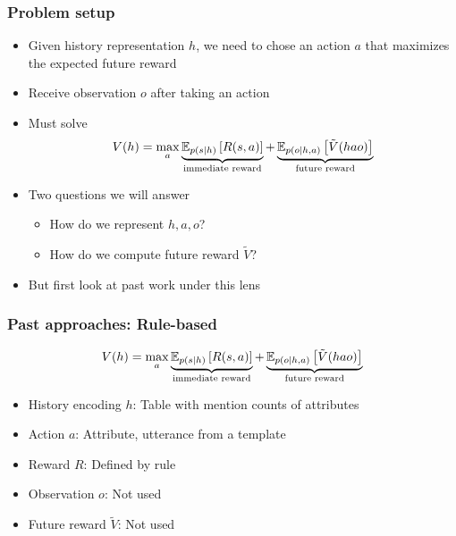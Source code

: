 \documentclass{beamer}
\begin{document}
\begin{frame}
\frametitle{Problem setup}
\begin{itemize}
\item Given history representation $h$,
we need to chose an action $a$
that maximizes the expected future reward
\item Receive observation $o$ after taking an action
\item Must solve
\begin{equation*}
V(h) = \max_a \underbrace{\mathbb{E}_{p(s \mid h)}\left[R(s, a)\right]}_{\text{immediate reward}}
+ \underbrace{\mathbb{E}_{p(o\mid h, a)}\left[\tilde{V}(hao)\right]}_{\text{future reward}}
\end{equation*}
\item Two questions we will answer
    \begin{itemize}
    \item How do we represent $h,a,o$?
    \item How do we compute future reward $\tilde{V}$?
    \end{itemize}
\item But first look at past work under this lens
\end{itemize}
\end{frame}

\begin{frame}
\frametitle{Past approaches: Rule-based}
\begin{equation*}
V(h) = \max_a \underbrace{\mathbb{E}_{p(s \mid h)}\left[R(s, a)\right]}_{\text{immediate reward}}
+ \underbrace{\mathbb{E}_{p(o\mid h, a)}\left[\tilde{V}(hao)\right]}_{\text{future reward}}
\end{equation*}

\begin{itemize}
\item History encoding $h$: Table with mention counts of attributes
\item Action $a$: Attribute, utterance
    from a template
\item Reward $R$: Defined by rule
\item Observation $o$: Not used
\item Future reward $\tilde{V}$: Not used
\end{itemize}
\end{frame}
\end{document}
